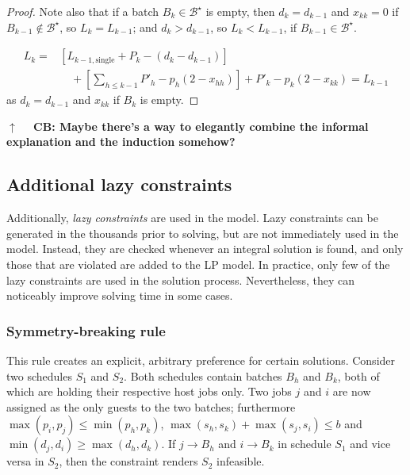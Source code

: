 \documentclass[oribibl]{llncs}
\begin{document}
\begin{proof}
Note also that if a batch $B_k \in \mathcal{B}^\star$ is empty, then $d_k =
d_{k-1}$ and $x_{kk}=0$ if $B_{k-1} \notin
\mathcal{B}^\star$, so $L_k = L_{k-1}$; and $d_k > d_{k-1}$, so $L_k < L_{k-1}$, if $B_{k-1} \in
\mathcal{B}^\star$.

\begin{align*}
L_k =
&\left[L_{{k-1},\mathrm{single}} + P_k - (d_k - d_{k-1})\right] \\&\quad+\left[\sum_{h\leq k-1}
P'_h-p_h(2-x_{hh}) \right] + P'_k - p_k(2-x_{kk}) = L_{k-1}
\end{align*}
as $d_k = d_{k-1}$
and $x_{kk}$ if $B_k$ is empty.

\end{proof}

\textbf{$\uparrow \quad$ CB: Maybe there's a way to elegantly combine the
informal explanation and the induction somehow? }

\subsection{Additional lazy constraints}
Additionally, \textit{lazy constraints} \cite{cplexmanual} are used in the model. Lazy
constraints can be generated in the thousands prior to solving, but are
not immediately used in the model. Instead, they are checked
whenever an integral solution is found, and only those that are violated
are added to the LP model. In practice, only few of the lazy constraints
are used in the solution process. Nevertheless, they can noticeably
improve solving time in some cases.

\subsubsection{Symmetry-breaking rule}
This rule creates an explicit, arbitrary preference for certain solutions.
Consider two schedules $S_1$ and
$S_2$. Both schedules contain batches $B_h$ and $B_k$, both of which
are holding their respective host jobs only. Two jobs $j$ and $i$ are now
assigned as the only guests to the two batches; furthermore $\max(p_i, p_j) \leq
\min(p_h, p_k)$, $\max(s_h, s_k) + \max(s_j, s_i) \leq b$ and
$\min(d_j, d_i) \geq \max(d_h, d_k)$. If $j \rightarrow
B_h$ and $i \rightarrow B_k$ in schedule $S_1$ and vice versa in
$S_2$, then the constraint renders $S_2$ infeasible.
\end{document}

